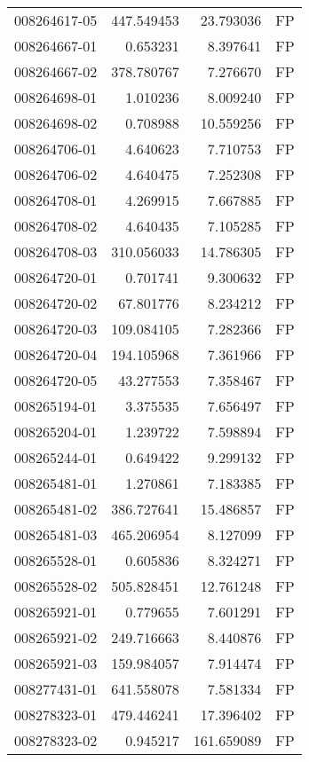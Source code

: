 \begin{tabular}{lrrl}
008264617-05 &  447.549453 &    23.793036 &   FP \\
008264667-01 &    0.653231 &     8.397641 &   FP \\
008264667-02 &  378.780767 &     7.276670 &   FP \\
008264698-01 &    1.010236 &     8.009240 &   FP \\
008264698-02 &    0.708988 &    10.559256 &   FP \\
008264706-01 &    4.640623 &     7.710753 &   FP \\
008264706-02 &    4.640475 &     7.252308 &   FP \\
008264708-01 &    4.269915 &     7.667885 &   FP \\
008264708-02 &    4.640435 &     7.105285 &   FP \\
008264708-03 &  310.056033 &    14.786305 &   FP \\
008264720-01 &    0.701741 &     9.300632 &   FP \\
008264720-02 &   67.801776 &     8.234212 &   FP \\
008264720-03 &  109.084105 &     7.282366 &   FP \\
008264720-04 &  194.105968 &     7.361966 &   FP \\
008264720-05 &   43.277553 &     7.358467 &   FP \\
008265194-01 &    3.375535 &     7.656497 &   FP \\
008265204-01 &    1.239722 &     7.598894 &   FP \\
008265244-01 &    0.649422 &     9.299132 &   FP \\
008265481-01 &    1.270861 &     7.183385 &   FP \\
008265481-02 &  386.727641 &    15.486857 &   FP \\
008265481-03 &  465.206954 &     8.127099 &   FP \\
008265528-01 &    0.605836 &     8.324271 &   FP \\
008265528-02 &  505.828451 &    12.761248 &   FP \\
008265921-01 &    0.779655 &     7.601291 &   FP \\
008265921-02 &  249.716663 &     8.440876 &   FP \\
008265921-03 &  159.984057 &     7.914474 &   FP \\
008277431-01 &  641.558078 &     7.581334 &   FP \\
008278323-01 &  479.446241 &    17.396402 &   FP \\
008278323-02 &    0.945217 &   161.659089 &   FP \\

\end{tabular}
